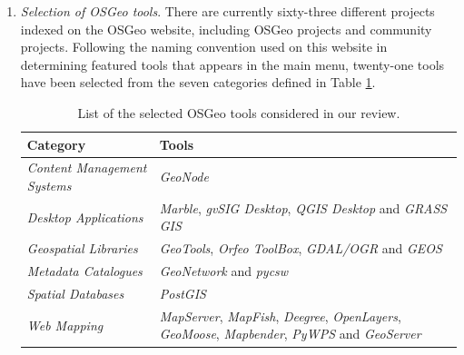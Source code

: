 \documentclass[ijgi,article,submit,moreauthors,pdftex]{Definitions/mdpi}
\begin{document}
\begin{enumerate}
\item \textit{Selection of OSGeo tools}. There are currently sixty-three different projects indexed on the OSGeo website, including OSGeo projects and community projects. Following the naming convention used on this website in determining featured tools that appears in the main menu, twenty-one tools have been selected from the seven categories defined in Table \ref{tab:tab1}.

\begin{table}[!ht]
    \begin{center}
        \begin{tabularx}{\textwidth}{l X}
            \hline
            \hline
            \textbf{Category}  & \textbf{Tools} \\ 
            \hline
            \textit{Content Management Systems} & \textit{GeoNode}\\
            \textit{Desktop Applications} & \textit{Marble}, \textit{gvSIG Desktop}, \textit{QGIS Desktop} and \textit{GRASS GIS}\\ 
            \textit{Geospatial Libraries} & \textit{GeoTools}, \textit{Orfeo ToolBox}, \textit{GDAL/OGR} and \textit{GEOS}\\
            \textit{Metadata Catalogues} & \textit{GeoNetwork} and \textit{pycsw}\\
            \textit{Spatial Databases} & \textit{PostGIS}\\
            \textit{Web Mapping} & \textit{MapServer}, \textit{MapFish}, \textit{Deegree}, \textit{OpenLayers}, \textit{GeoMoose}, \textit{Mapbender}, \textit{PyWPS} and \textit{GeoServer}\\ 
            \hline
            \hline 
        \end{tabularx}
    \end{center}
    \caption{List of the selected OSGeo tools considered in our review.}
    \label{tab:tab1}
\end{table}


\end{enumerate}
\end{document}

